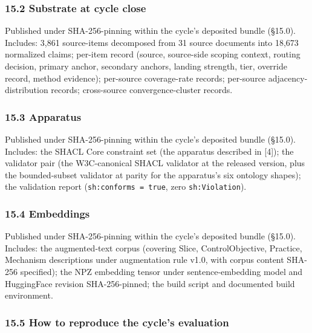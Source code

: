\documentclass[
]{article}
\begin{document}
\subsubsection{15.2 Substrate at cycle
close}\label{substrate-at-cycle-close}

Published under SHA-256-pinning within the cycle's deposited bundle
(§15.0). Includes: 3,861 source-items decomposed from 31 source
documents into 18,673 normalized claims; per-item record (source,
source-side scoping context, routing decision, primary anchor, secondary
anchors, landing strength, tier, override record, method evidence);
per-source coverage-rate records; per-source adjacency-distribution
records; cross-source convergence-cluster records.

\subsubsection{15.3 Apparatus}\label{apparatus}

Published under SHA-256-pinning within the cycle's deposited bundle
(§15.0). Includes: the SHACL Core constraint set (the apparatus
described in {[}4{]}); the validator pair (the W3C-canonical SHACL
validator at the released version, plus the bounded-subset validator at
parity for the apparatus's six ontology shapes); the validation report
(\texttt{sh:conforms\ =\ true}, zero \texttt{sh:Violation}).

\subsubsection{15.4 Embeddings}\label{embeddings}

Published under SHA-256-pinning within the cycle's deposited bundle
(§15.0). Includes: the augmented-text corpus (covering Slice,
ControlObjective, Practice, Mechanism descriptions under augmentation
rule v1.0, with corpus content SHA-256 specified); the NPZ embedding
tensor under sentence-embedding model and HuggingFace revision
SHA-256-pinned; the build script and documented build environment.

\subsubsection{15.5 How to reproduce the cycle's
evaluation}\label{how-to-reproduce-the-cycles-evaluation}
\end{document}
